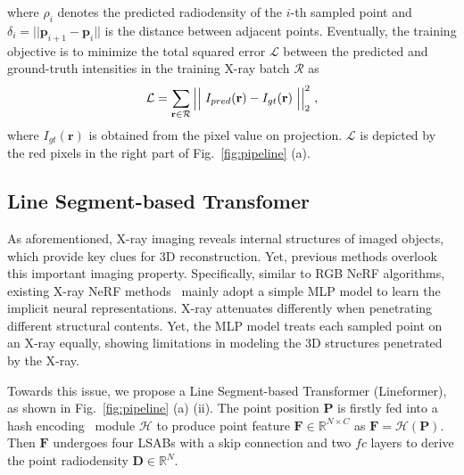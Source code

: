 \documentclass[10pt,twocolumn,letterpaper]{article}
\begin{document}
where $\rho_i$ denotes the predicted radiodensity of the $i$-th sampled point and $\delta_i = || \mathbf{p}_{i+1} - \mathbf{p}_{i} ||$ is the distance between adjacent points. Eventually, the training objective is to minimize the total squared error $\mathcal{L}$ between the predicted and ground-truth intensities in the training X-ray batch $\mathcal{R}$ as
\vspace{0.1mm}
\begin{equation}
\small
\mathcal{L} = \sum_{\mathbf{r} \in \mathcal{R}} \Big|\Big|~ {I}_{pred}(\mathbf{r}) - {I}_{gt}\mathbf{(r)} ~\Big|\Big|^2_2~,
\vspace{-0.1mm}
\end{equation}
where $I_{gt}(\mathbf{r})$ is obtained from the pixel value on  projection. $\mathcal{L}$ is depicted by the red pixels in the right part of Fig.~\ref{fig:pipeline} (a).

\subsection{Line Segment-based Transfomer}
As aforementioned, X-ray imaging reveals internal structures of imaged objects, which provide key clues for 3D reconstruction. Yet, previous methods overlook this important imaging property. Specifically, similar to RGB NeRF algorithms, existing X-ray NeRF methods~\cite{naf,intratomo} mainly adopt a simple MLP model to learn the implicit neural representations. X-ray attenuates differently when penetrating different structural contents. Yet, the MLP model treats each sampled point on an X-ray equally, showing limitations in modeling the 3D structures penetrated by the X-ray.

Towards this issue, we propose a Line Segment-based Transformer (Lineformer), as shown in Fig.~\ref{fig:pipeline} (a) (ii). The point position $\mathbf{P}$ is firstly fed into a hash encoding~\cite{instant_ngp} module $\mathcal{H}$ to produce point feature $\mathbf{F} \in \mathbb{R}^{N \times C}$ as $\mathbf{F} = \mathcal{H}(\mathbf{P})$. Then $\mathbf{F}$ undergoes four LSABs with a skip connection and two $fc$ layers to derive the point radiodensity $\mathbf{D} \in \mathbb{R}^{N}$.
\end{document}
